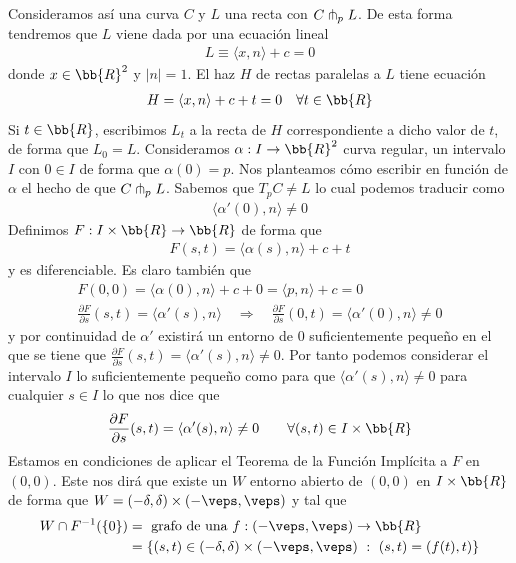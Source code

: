Consideramos así una curva $C$ y $L$ una recta con $C\pitchfork_p L$. De esta forma tendremos que $L$ viene dada por una ecuación lineal 
\begin{gather*}
    L \equiv \langle x,n \rangle + c = 0
\end{gather*}
donde $x\in \bb{R}^2$ y $|n|=1$. El haz $H$ de rectas paralelas a $L$ tiene ecuación 
\begin{gather*}
    H = \langle x, n \rangle + c + t = 0 \quad \forall t \in \bb{R}
\end{gather*}
Si $t \in \bb{R}$, escribimos $L_t$ a la recta de $H$ correspondiente a dicho valor de $t$, de forma que $L_0=L$. Consideramos $\alpha:I \to \bb{R}^2$ curva regular, un intervalo $I$ con $0\in I$ de forma que $\alpha(0)=p$. Nos planteamos cómo escribir en función de $\alpha$ el hecho de que $C\pitchfork_pL$. Sabemos que $T_pC \neq L$ lo cual podemos traducir como 
\begin{gather*}
    \langle \alpha'(0),n \rangle \neq 0
\end{gather*}
Definimos $F: I \times \bb{R} \to \bb{R}$ de forma que 
\begin{gather*}
    F(s,t) = \langle \alpha(s), n \rangle + c + t
\end{gather*}
y es diferenciable. Es claro también que
\begin{gather*}
    F(0,0) = \langle \alpha(0), n \rangle + c + 0 = \langle p,n \rangle + c = 0\\[0.8em]
    \frac{\partial F}{\partial s} (s,t) = \langle \alpha'(s), n \rangle \quad \Rightarrow \quad
    \frac{\partial F}{\partial s}(0,t) = \langle \alpha'(0), n \rangle \neq 0
\end{gather*}
y por continuidad de $\alpha'$ existirá un entorno de $0$ suficientemente pequeño en el que se tiene que $\frac{\partial F}{\partial s}(s,t) = \langle \alpha'(s), n \rangle \neq 0$. Por tanto podemos considerar el intervalo $I$ lo suficientemente pequeño como para que $\langle \alpha'(s), n \rangle\neq 0$ para cualquier $s\in I$ lo que nos dice que 
\begin{gather*}
    \frac{\partial F}{\partial s}(s,t) = \langle \alpha'(s), n \rangle \neq 0 \qquad \forall (s,t) \in I\times \bb{R}
\end{gather*}
Estamos en condiciones de aplicar el Teorema de la Función Implícita a $F$ en $(0,0)$. Este nos dirá que existe un $W$ entorno abierto de $(0,0)$ en $I \times \bb{R}$ de forma que $W=(-\delta , \delta) \times (-\veps, \veps)$ y tal que 
\begin{align*}
    W\cap F^{-1}(\{0\}) &= \text{ grafo de una }f:(-\veps, \veps) \to \bb{R}\\
    &= \{(s,t)\in (-\delta , \delta) \times (-\veps, \veps)\ : \ (s,t) = (f(t), t) \}
\end{align*}
